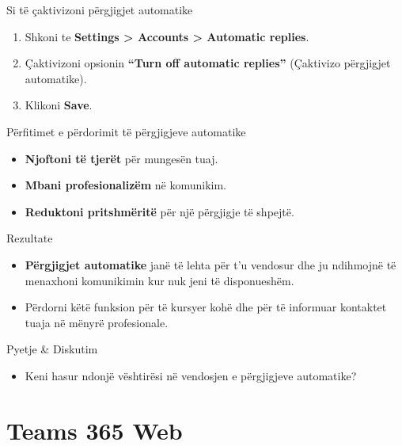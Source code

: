 \documentclass[
  ignorenonframetext,
]{beamer}
\providecommand{\tightlist}{%
  \setlength{\itemsep}{0pt}\setlength{\parskip}{0pt}}
\begin{document}
\begin{frame}{Si të çaktivizoni përgjigjet automatike}
\label{si-tuxeb-uxe7aktivizoni-puxebrgjigjet-automatike}
\begin{enumerate}
\item
  Shkoni te \textbf{Settings \textgreater{} Accounts \textgreater{}
  Automatic replies}.
\item
  Çaktivizoni opsionin \textbf{``Turn off automatic replies''}
  (Çaktivizo përgjigjet automatike).
\item
  Klikoni \textbf{Save}.
\end{enumerate}
\end{frame}

\begin{frame}{Përfitimet e përdorimit të përgjigjeve automatike}
\label{puxebrfitimet-e-puxebrdorimit-tuxeb-puxebrgjigjeve-automatike}
\begin{itemize}
\item
  \textbf{Njoftoni të tjerët} për mungesën tuaj.
\item
  \textbf{Mbani profesionalizëm} në komunikim.
\item
  \textbf{Reduktoni pritshmëritë} për një përgjigje të shpejtë.
\end{itemize}
\end{frame}

\begin{frame}{Rezultate}
\label{rezultate-4}
\begin{itemize}
\item
  \textbf{Përgjigjet automatike} janë të lehta për t'u vendosur dhe ju
  ndihmojnë të menaxhoni komunikimin kur nuk jeni të disponueshëm.
\item
  Përdorni këtë funksion për të kursyer kohë dhe për të informuar
  kontaktet tuaja në mënyrë profesionale.
\end{itemize}
\end{frame}

\begin{frame}{Pyetje \& Diskutim}
\label{pyetje-diskutim-7}
\begin{itemize}
\tightlist
\item
  Keni hasur ndonjë vështirësi në vendosjen e përgjigjeve automatike?
\end{itemize}
\end{frame}

\section{Teams 365 Web}\label{teams-365-web}
\end{document}
